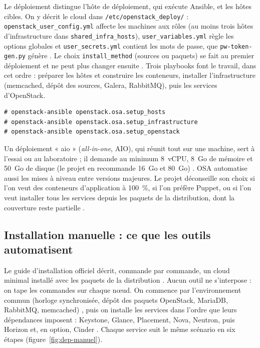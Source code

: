 Le déploiement distingue l'hôte de déploiement, qui exécute Ansible, et les hôtes cibles. On y décrit le cloud dans
\texttt{/etc/openstack\_deploy/} : \texttt{openstack\_user\_config.yml} affecte les machines aux rôles (au moins trois hôtes
d'infrastructure dans \texttt{shared\_infra\_hosts}), \texttt{user\_variables.yml} règle les options globales et
\texttt{user\_secrets.yml} contient les mots de passe, que \texttt{pw-token-gen.py} génère \parencite{osa-config}. Le choix
\texttt{install\_method} (sources ou paquets) se fait au premier déploiement et ne peut plus changer ensuite \parencite{osa-config}.
Trois \glspl{playbook} font le travail, dans cet ordre \parencite{osa-run} : préparer les hôtes et construire les conteneurs, installer l'infrastructure (memcached, dépôt des sources, Galera, RabbitMQ), puis les services d'OpenStack.

\par\noindent\begin{minipage}{\linewidth}
\begin{lstlisting}[style=terminal]
# openstack-ansible openstack.osa.setup_hosts
# openstack-ansible openstack.osa.setup_infrastructure
# openstack-ansible openstack.osa.setup_openstack
\end{lstlisting}
\end{minipage}\par

Un déploiement « \gls{aio} » (\emph{all-in-one}, AIO), qui réunit tout sur une machine, sert à l'essai ou au laboratoire ; il demande
au minimum 8~vCPU, 8~Go de mémoire et 50~Go de disque (le projet en recommande 16~Go et 80~Go) \parencite{osa-aio}. OSA automatise
aussi les mises à niveau entre versions majeures. Le projet déconseille son choix si l'on veut des conteneurs d'application à 100~\%, si l'on
préfère Puppet, ou si l'on veut installer tous les services depuis les paquets de la distribution, dont la couverture reste partielle
\parencite{osa-about}.

\subsection{Installation manuelle : ce que les outils automatisent}\label{sec:dep-manuel}

Le guide d'installation officiel décrit, commande par commande, un cloud minimal installé avec les paquets de la distribution
\parencite{install-guide,install-overview}. Aucun outil ne s'interpose : on tape les commandes sur chaque nœud. On commence par
l'environnement commun (horloge synchronisée, dépôt des paquets OpenStack, MariaDB, RabbitMQ, memcached)
\parencite{install-env,install-packages-ubuntu,install-sql-ubuntu,install-messaging-ubuntu}, puis on installe les services dans
l'ordre que leurs dépendances imposent : Keystone, Glance, Placement, Nova, Neutron, puis Horizon et, en option, Cinder
\parencite{install-overview}. Chaque service suit le même scénario en six étapes (figure~\ref{fig:dep-manuel}).

